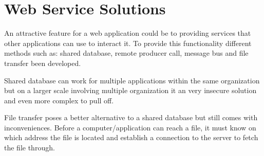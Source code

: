 \section{Web Service Solutions}
An attractive feature for a web application could be to providing services that other applications can use to interact it. To provide this functionality different methods such as: shared database, remote producer call, message bus and file transfer been developed.

Shared database can work for multiple applications within the same organization but on a larger scale involving multiple organization it an very insecure solution and even more complex to pull off.

File transfer poses a better alternative to a shared database but still comes with inconveniences. Before a computer/application can reach a file, it must know on which address the file is located and establish a connection to the server to fetch the file through.